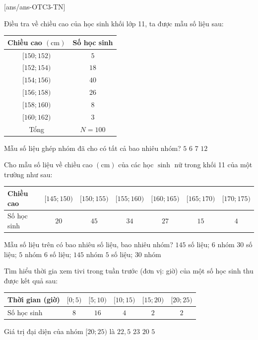 [ans/ans-OTC3-TN]
\caulc
\begin{ex}%
Điều tra về chiều cao của học sinh khối lớp 11, ta được mẫu số liệu sau:
\begin{center}
\begin{tabular}{|c|c|}
\hline Chiều cao $(\mathrm{cm})$ & Số học sinh \\
\hline$[150; 152)$ & $5$ \\
\hline$[152; 154)$ & $18$ \\
\hline$[154; 156)$ & $40$ \\
\hline$[156; 158)$ & $26$ \\
\hline$[158; 160)$ & $8$ \\
\hline$[160; 162)$ & $3$ \\
\hline Tổng & $N=100$ \\
\hline
\end{tabular}
\end{center}
Mẫu số liệu ghép nhóm đã cho có tất cả bao nhiêu nhóm?
	\choice
	{$5$}
	{\True $6$}
	{$7$}
	{$12$}
\end{ex}

\begin{ex}%
Cho mẫu số liệu về chiều cao $(\mathrm{cm})$ của các học $\sinh$ nữ trong khối 11 của một trường như sau:
\begin{center}
\begin{tabular}{|l|c|c|c|c|c|c|}
\hline Chiều cao & {$[145; 150)$} & {$[150; 155)$} & {$[155; 160)$} & {$[160; 165)$} & {$[165; 170)$} & {$[170; 175)$} \\
\hline Số học sinh & $20$ & $45$ & $34$ & $27$ & $15$ & $4$ \\
\hline
\end{tabular}
\end{center}
Mẫu số liệu trên có bao nhiêu số liệu, bao nhiêu nhóm?
	\choice
	{$145$ số liệu; $6$ nhóm}
	{$30$ số liệu; $5$ nhóm}
	{\True $6$ số liệu; $145$ nhóm}
	{$5$ số liệu; $30$ nhóm}
	\loigiai{
Mẫu số liệu $(T)$ có
$$20+45+34+27+15+4=145\text{ (số liệu).}$$
$6$ nhóm là $[145; 150)$; $[150; 155)$; $[155; 160)$; $[160; 165)$; $[165; 170)$; $[170; 175)$.
}
\end{ex}

\begin{ex}%
Tìm hiểu thời gia xem tivi trong tuần trước (đơn vị: giờ) của một số học sinh thu được kết quả sau:
\begin{center}
\begin{tabular}{|l|c|c|c|c|c|}
\hline Thời gian (giờ) & {$[0; 5)$} & {$[5; 10)$} & {$[10; 15)$} & {$[15; 20)$} & {$[20; 25)$} \\
\hline Số học sinh & $8$ & $16$ & $4$ & $2$ & $2$ \\
\hline
\end{tabular}
\end{center}
Giá trị đại diện của nhóm $[20; 25)$ là
	\choice
	{\True $22{,}5$}
	{$23$}
	{$20$}
	{$5$}
	\loigiai{
Giá trị đại diện của nhóm $[20; 25)$ là $\dfrac{20+25}{2}=22{,}5$.
}
\end{ex}

